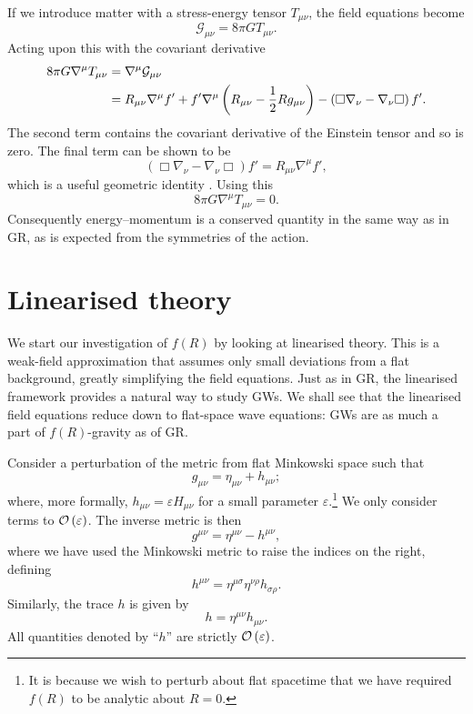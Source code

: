 If we introduce matter with a stress-energy tensor $T_{\mu\nu}$, the field equations become
\begin{equation}
\mathcal{G}_{\mu\nu} = 8\pi GT_{\mu\nu}.
\end{equation}
Acting upon this with the covariant derivative
\begin{align}
8\pi G\nabla^\mu T_{\mu\nu} = {} & \nabla^\mu\mathcal{G}_{\mu\nu} \nonumber \\*
 = {} & R_{\mu\nu}\nabla^\mu f' + f'\nabla^\mu\left(R_{\mu\nu} - \dfrac{1}{2}R g_{\mu\nu}\right) - \left(\Box\nabla_\nu - \nabla_\nu\Box\right)f'.
\end{align}
The second term contains the covariant derivative of the Einstein tensor and so is zero. The final term can be shown to be
\begin{equation}
\left(\Box\nabla_\nu - \nabla_\nu\Box\right)f' = R_{\mu\nu}\nabla^\mu f',
\end{equation}
which is a useful geometric identity \citep{Koivisto2006a}. Using this
\begin{equation}
8\pi G\nabla^\mu T_{\mu\nu} = 0.
\end{equation}
Consequently energy--momentum is a conserved quantity in the same way as in GR, as is expected from the symmetries of the action.

\section{Linearised theory}\label{sec:Lin}

We start our investigation of $f(R)$ by looking at linearised theory. This is a weak-field approximation that assumes only small deviations from a flat background, greatly simplifying the field equations. Just as in GR, the linearised framework provides a natural way to study GWs. We shall see that the linearised field equations reduce down to flat-space wave equations: GWs are as much a part of $f(R)$-gravity as of GR.

Consider a perturbation of the metric from flat Minkowski space such that
\begin{equation}
g_{\mu\nu} = \eta_{\mu\nu} + h_{\mu\nu};
\end{equation}
where, more formally, $h_{\mu\nu} = \varepsilon H_{\mu\nu}$ for a small parameter $\varepsilon$.\footnote{It is because we wish to perturb about flat spacetime that we have required $f(R)$ to be analytic about $R = 0$.} We only consider terms to $\mathcal{O}\left({\varepsilon}\right)$. The inverse metric is then
\begin{equation}
g^{\mu\nu} = \eta^{\mu\nu} - h^{\mu\nu},
\end{equation}
where we have used the Minkowski metric to raise the indices on the right, defining
\begin{equation}
h^{\mu\nu} = \eta^{\mu\sigma}\eta^{\nu\rho}h_{\sigma\rho}.
\end{equation}
Similarly, the trace $h$ is given by
\begin{equation}
h = \eta^{\mu\nu}h_{\mu\nu}.
\end{equation}
All quantities denoted by ``$h$'' are strictly $\mathcal{O}\left({\varepsilon}\right)$.

